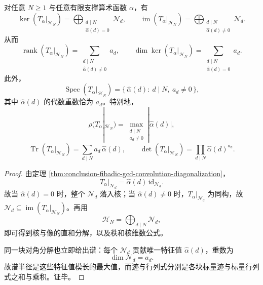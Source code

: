 \begin{theorem}\label{thm:conclusion-fibadic-finite-layer-gcd-kernel-image-spectrum-closedform}
对任意 \(N\ge 1\) 与任意有限支撑算术函数 \(\alpha\)，有
\[
\ker(T_\alpha|_{\mathcal H_N})
=
\bigoplus_{\substack{d\mid N\\ \widehat\alpha(d)=0}}\mathcal N_d,
\qquad
\operatorname{im}(T_\alpha|_{\mathcal H_N})
=
\bigoplus_{\substack{d\mid N\\ \widehat\alpha(d)\neq 0}}\mathcal N_d.
\]
从而
\[
\operatorname{rank}(T_\alpha|_{\mathcal H_N})
=
\sum_{\substack{d\mid N\\ \widehat\alpha(d)\neq 0}} a_d,
\qquad
\dim\ker(T_\alpha|_{\mathcal H_N})
=
\sum_{\substack{d\mid N\\ \widehat\alpha(d)= 0}} a_d.
\]
此外，
\[
\operatorname{Spec}(T_\alpha|_{\mathcal H_N})
=
\{\,\widehat\alpha(d):\ d\mid N,\ a_d\neq 0\,\},
\]
其中 \(\widehat\alpha(d)\) 的代数重数恰为 \(a_d\)。特别地，
\[
\rho(T_\alpha|_{\mathcal H_N})
=
\max_{\substack{d\mid N\\ a_d\neq 0}}|\widehat\alpha(d)|,
\]
\[
\operatorname{Tr}(T_\alpha|_{\mathcal H_N})
=
\sum_{d\mid N}a_d\,\widehat\alpha(d),
\qquad
\det(T_\alpha|_{\mathcal H_N})
=
\prod_{d\mid N}\widehat\alpha(d)^{a_d}.
\]
\end{theorem}
\begin{proof}
由定理 \ref{thm:conclusion-fibadic-gcd-convolution-diagonalization}，
\[
T_\alpha|_{\mathcal N_d}=\widehat\alpha(d)\,\mathrm{id}_{\mathcal N_d}.
\]
故当 \(\widehat\alpha(d)=0\) 时，整个 \(\mathcal N_d\) 落入核；当 \(\widehat\alpha(d)\neq 0\) 时，\(T_\alpha|_{\mathcal N_d}\) 为同构，故 \(\mathcal N_d\subseteq \operatorname{im}(T_\alpha|_{\mathcal H_N})\)。再用
\[
\mathcal H_N=\bigoplus_{d\mid N}\mathcal N_d,
\]
即可得到核与像的直和分解，以及秩和核维数公式。

同一块对角分解也立即给出谱：每个 \(\mathcal N_d\) 贡献唯一特征值 \(\widehat\alpha(d)\)，重数为
\[
\dim \mathcal N_d=a_d.
\]
故谱半径是这些特征值模长的最大值，而迹与行列式分别是各块标量迹与标量行列式之和与乘积。证毕。
\end{proof}


